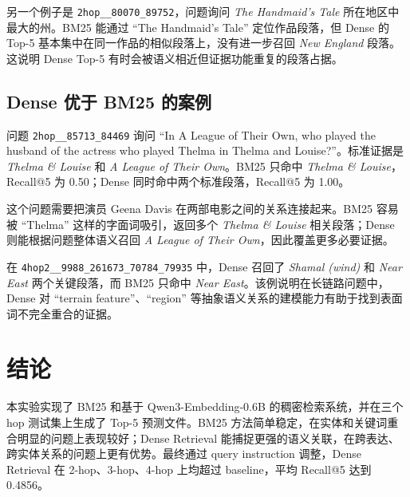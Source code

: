 \documentclass[12pt,letterpaper]{article}
\begin{document}
另一个例子是 \texttt{2hop\_\_80070\_89752}，问题询问 \emph{The Handmaid's Tale} 所在地区中最大的州。BM25 能通过 ``The Handmaid's Tale'' 定位作品段落，但 Dense 的 Top-5 基本集中在同一作品的相似段落上，没有进一步召回 \emph{New England} 段落。这说明 Dense Top-5 有时会被语义相近但证据功能重复的段落占据。

\subsection{Dense 优于 BM25 的案例}

问题 \texttt{2hop\_\_85713\_84469} 询问 ``In A League of Their Own, who played the husband of the actress who played Thelma in Thelma and Louise?''。标准证据是 \emph{Thelma \& Louise} 和 \emph{A League of Their Own}。BM25 只命中 \emph{Thelma \& Louise}，Recall@5 为 0.50；Dense 同时命中两个标准段落，Recall@5 为 1.00。

这个问题需要把演员 Geena Davis 在两部电影之间的关系连接起来。BM25 容易被 ``Thelma'' 这样的字面词吸引，返回多个 \emph{Thelma \& Louise} 相关段落；Dense 则能根据问题整体语义召回 \emph{A League of Their Own}，因此覆盖更多必要证据。

在 \texttt{4hop2\_\_9988\_261673\_70784\_79935} 中，Dense 召回了 \emph{Shamal (wind)} 和 \emph{Near East} 两个关键段落，而 BM25 只命中 \emph{Near East}。该例说明在长链路问题中，Dense 对 ``terrain feature''、``region'' 等抽象语义关系的建模能力有助于找到表面词不完全重合的证据。

\section{结论}

本实验实现了 BM25 和基于 Qwen3-Embedding-0.6B 的稠密检索系统，并在三个 hop 测试集上生成了 Top-5 预测文件。BM25 方法简单稳定，在实体和关键词重合明显的问题上表现较好；Dense Retrieval 能捕捉更强的语义关联，在跨表达、跨实体关系的问题上更有优势。最终通过 query instruction 调整，Dense Retrieval 在 2-hop、3-hop、4-hop 上均超过 baseline，平均 Recall@5 达到 0.4856。



\end{document}
